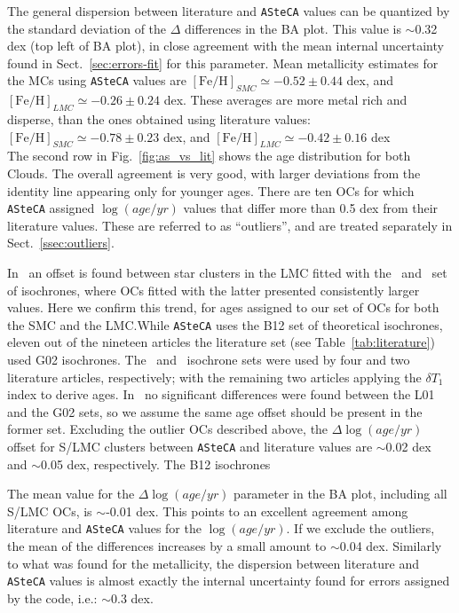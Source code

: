 \documentclass{aa}
\begin{document}
The general dispersion between literature and \texttt{ASteCA} values can be
quantized by the standard deviation of the $\Delta$ differences in the BA plot.
This value is $\sim$0.32 dex (top left of BA plot), in close agreement with the
mean internal uncertainty found in Sect.~\ref{sec:errors-fit} for this
parameter. Mean metallicity estimates for the MCs using \texttt{ASteCA} values
are $\mathrm{[Fe/H]}_{SMC}{\simeq-}0.52{\pm}0.44$ dex, and
$\mathrm{[Fe/H]}_{LMC}{\simeq-}0.26{\pm}0.24$ dex. These averages are more
metal rich and disperse, than the ones obtained using literature values:
$\mathrm{[Fe/H]}_{SMC}{\simeq-}0.78{\pm}0.23$ dex, and
$\mathrm{[Fe/H]}_{LMC}{\simeq-}0.42{\pm}0.16$ dex\\

The second row in Fig.~\ref{fig:as_vs_lit} shows the age distribution for both
Clouds. The overall agreement is very good, with larger deviations from the
identity line appearing only for younger ages. There are ten OCs for which
\texttt{ASteCA} assigned $\log(age/yr)$ values that differ more than 0.5 dex
from their literature values. These are referred to as ``outliers'', and are
treated separately in Sect.~\ref{ssec:outliers}.

In~\cite{Palma_2015b} an offset is found between star clusters in the LMC
fitted with the~\citet[][G02]{Girardi_2002} and~\citet[][B12]{Bressan_2012} set
of isochrones, where OCs fitted with the latter presented consistently larger
values.
%
Here we confirm this trend, for ages assigned to our set of OCs for both the
SMC and the LMC.\@ While \texttt{ASteCA} uses the B12 set of theoretical
isochrones, eleven out of the nineteen articles the literature set 
(see Table~\ref{tab:literature}) used G02 isochrones.
The~\citet[][L01]{Lejeune_2001} and~\cite{Marigo_2008} isochrone sets were used
by four and two literature articles, respectively; with the remaining two
articles applying the $\delta T_1$ index to derive ages.
In~\cite{Piatti_2003b,Piatti_2003a,Piatti_2007a} no significant
differences were found between the L01 and the G02 sets, so we assume the same
age offset should be present in the former set.
%
Excluding the outlier OCs described above, the $\Delta \log(age/yr)$ offset for
S/LMC clusters between \texttt{ASteCA} and literature values are $\sim$0.02 dex
and $\sim$0.05 dex, respectively. The B12 isochrones 

The mean value for the $\Delta \log(age/yr)$ parameter in the BA plot, including
all S/LMC OCs, is $\sim$-0.01 dex. This points to an excellent agreement among
literature and \texttt{ASteCA} values for the $\log(age/yr)$.
If we exclude the outliers, the mean of the differences increases by a small
amount to $\sim$0.04 dex. Similarly to what was found for the metallicity,
the dispersion between literature and \texttt{ASteCA} values is almost exactly
the internal uncertainty found for errors assigned by the code, i.e.: $\sim$0.3
dex.\\
\end{document}
